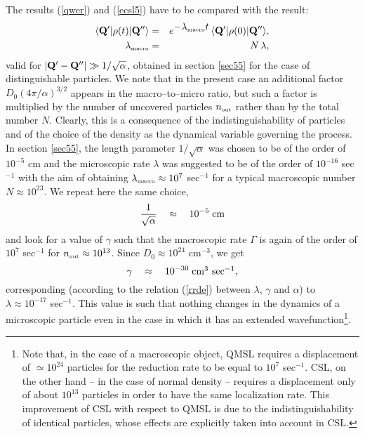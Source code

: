 \documentclass[10pt,a4paper]{article}
\begin{document}
The results  (\ref{qwer}) and (\ref{ecsl5}) have to be compared
with the result:
\begin{eqnarray}
\langle {\bf Q}'| \rho(t) |{\bf Q}'' \rangle & = &
e^{\displaystyle - \lambda_{\makebox{\tiny macro}} t}\,
\langle {\bf Q}'| \rho(0) |{\bf Q}''\rangle, \\
\lambda_{\makebox{\tiny macro}} & = & N\, \lambda,
\end{eqnarray}
valid for $|{\bf Q}' - {\bf Q}''| \gg 1/\sqrt{\alpha}$, obtained
in section \ref{sec55} for the case of distinguishable particles.
We note that in the present case an additional factor $D_{0} (4\pi
/\alpha)^{3/2}$ appears in the macro--to--micro ratio, but such a
factor is multiplied by the number of uncovered particles
$n_{\makebox{\tiny out}}$ rather than by the total number $N$.
Clearly, this is a consequence of the indistinguishability of
particles and of the choice of the density as the dynamical
variable governing the process. In section \ref{sec55}, the length
parameter $1/\sqrt{\alpha}$ was chosen to be of the order of
$10^{-5}$ cm and the microscopic rate $\lambda$ was suggested to
be of the order of $10^{-16}$ sec$^{-1}$ with the aim of obtaining
$\lambda_{\makebox{\tiny macro}} \approx 10^7$ sec$^{-1}$ for a
typical macroscopic number $N \approx 10^{23}$. We repeat here the
same choice,
\begin{equation} \label{fn1}
\frac{1}{\sqrt{\alpha}} \quad \approx \quad 10^{-5}\; \makebox{cm}
\end{equation}
and look for a value of $\gamma$ such that the macroscopic rate
$\Gamma$ is again of the order of $10^7$ sec$^{-1}$ for
$n_{\makebox{\tiny out}} \approx 10^{13}$. Since $D_{0} \approx
10^{24}$ cm$^{-3}$, we get
\begin{equation} \label{fn2}
\gamma \quad \approx \quad 10^{-30}\; \makebox{cm$^3$ sec$^{-1}$},
\end{equation}
corresponding (according to the relation (\ref{rrde}) between
$\lambda$, $\gamma$ and $\alpha$) to $\lambda \approx 10^{-17}$
sec$^{-1}$. This value is such that nothing changes in the
dynamics of a microscopic particle even in the case in which it
has an extended wavefunction\footnote{Note that, in the case of a
macroscopic object, QMSL requires a displacement of $\simeq
10^{24}$ particles for the reduction rate to be equal to $10^{7}$
sec${}^{-1}$. CSL, on the other hand -- in the case of normal
density -- requires a displacement only of about $10^{13}$ particles in
order to have the same localization rate. This improvement of CSL with
respect to QMSL is due to the indistinguishability of identical
particles, whose effects are explicitly taken into account in CSL.}.
\end{document}
